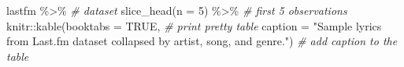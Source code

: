 \documentclass[
]{article}
\newenvironment{Shaded}{\begin{snugshade}}{\end{snugshade}}
\newcommand{\AttributeTok}[1]{\textcolor[rgb]{0.77,0.63,0.00}{#1}}
\newcommand{\CommentTok}[1]{\textcolor[rgb]{0.56,0.35,0.01}{\textit{#1}}}
\newcommand{\ConstantTok}[1]{\textcolor[rgb]{0.00,0.00,0.00}{#1}}
\newcommand{\DecValTok}[1]{\textcolor[rgb]{0.00,0.00,0.81}{#1}}
\newcommand{\FunctionTok}[1]{\textcolor[rgb]{0.00,0.00,0.00}{#1}}
\newcommand{\NormalTok}[1]{#1}
\newcommand{\SpecialCharTok}[1]{\textcolor[rgb]{0.00,0.00,0.00}{#1}}
\newcommand{\StringTok}[1]{\textcolor[rgb]{0.31,0.60,0.02}{#1}}
\begin{document}
\begin{Shaded}
\begin{Highlighting}[]
\NormalTok{lastfm }\SpecialCharTok{\%\textgreater{}\%} \CommentTok{\# dataset}
  \FunctionTok{slice\_head}\NormalTok{(}\AttributeTok{n =} \DecValTok{5}\NormalTok{) }\SpecialCharTok{\%\textgreater{}\%} \CommentTok{\# first 5 observations}
\NormalTok{  knitr}\SpecialCharTok{::}\FunctionTok{kable}\NormalTok{(}\AttributeTok{booktabs =} \ConstantTok{TRUE}\NormalTok{, }\CommentTok{\# print pretty table}
               \AttributeTok{caption =} \StringTok{"Sample lyrics from Last.fm dataset collapsed by artist, song, and genre."}\NormalTok{) }\CommentTok{\# add caption to the table}
\end{Highlighting}
\end{Shaded}

\begin{table}


\end{table}
\end{document}
